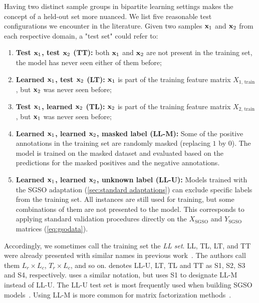 Having two distinct sample groups in bipartite learning settings makes the concept of a held-out set more nuanced. We list five reasonable test configurations we encounter in the literature. Given two samples $\mathbf{x}_1$ and $\mathbf{x}_2$ from each respective domain, a "test set" could refer to:
%
\begin{enumerate}
    \item \textbf{Test $\mathbf{x}_1$, test $\mathbf{x}_2$ (TT):} both $\mathbf{x}_1$ and $\mathbf{x}_2$ are not present in the training set, the model has never seen either of them before;
    \item \textbf{Learned $\mathbf{x}_1$, test $\mathbf{x}_2$ (LT):} $\mathbf{x}_1$ is part of the training feature matrix $X_{1\text{, train}}$, but $\mathbf{x}_2$ was never seen before;
    \item \textbf{Test $\mathbf{x}_1$, learned $\mathbf{x}_2$ (TL):} $\mathbf{x}_2$ is part of the training feature matrix $X_{2\text{, train}}$, but $\mathbf{x}_1$ was never seen before;
    \item \textbf{Learned $\mathbf{x}_1$, learned $\mathbf{x}_2$, masked label (LL-M):}
    Some of the positive annotations in the training set are randomly masked (replacing $1$ by $0$).
    The model is trained on the masked dataset and evaluated based on the predictions for the masked positives and the negative annotations.
    \item \textbf{Learned $\mathbf{x}_1$, learned $\mathbf{x}_2$, unknown label (LL-U):}
    Models trained with the SGSO adaptation (\autoref{sec:standard adaptations}) can exclude specific labels from the training set. All instances are still used for training, but some combinations of them are not presented to the model.
    This corresponds to applying standard validation procedures directly on the $X_\text{SGSO}$ and $Y_\text{SGSO}$ matrices (\autoref{eq:gsodata}).
\end{enumerate}
%
Accordingly, we sometimes call the training set the \emph{LL set}.
LL, TL, LT, and TT were already presented with similar names in previous work~\cite{schrynemackers2015classifying,pliakos2018global,pliakos2020drugtarget}. %
The authors call them $L_r \times L_c$, $T_r \times L_c$, and so on.
\cite{pahikkala2015more,ezzat2019computational,liu2016neighborhood} denotes LL-U, LT, TL and TT as S1, S2, S3 and S4, respectively.
\cite{liu2016neighborhood} uses a similar notation, but uses S1 to designate LL-M instead of LL-U. %
%
The LL-U test set is most frequently used when building SGSO models~\cite{pahikkala2015more}.
Using LL-M is more common for matrix factorization methods~\cite{liu2016neighborhood,hao2017predicting,li2019dnilmflda}.

